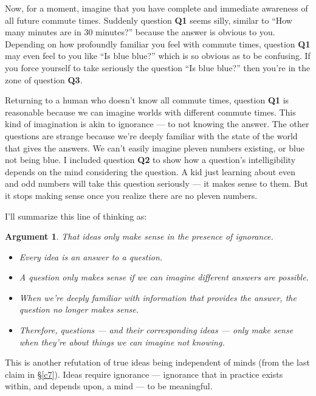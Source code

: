 \documentclass[9pt, twoside]{book}
\theoremstyle{argtstyle}
\newtheorem*{argt}{Argument}
\begin{document}
Now, for a moment, imagine that you have complete and immediate awareness of all
future commute times. Suddenly question {\bf Q1} seems silly, similar to
``How many minutes are in 30 minutes?''
because the answer is obvious to you.
Depending on how profoundly
familiar you feel with commute times, question {\bf Q1} may even feel to you
like ``Is blue blue?'' which is so obvious as to be confusing. If you force
yourself to take seriously the question ``Is blue blue?'' then you're in the
zone of question {\bf Q3}.

Returning to a human who doesn't know all commute times,
question {\bf Q1} is
reasonable because we can imagine worlds with different commute
times. This kind of imagination is akin to ignorance --- to not knowing the
answer.
The other questions are strange because we're deeply familiar with the state of
the world that gives the answers. We can't easily imagine pleven numbers
existing, or blue not being blue.
I included question {\bf Q2} to show how a question's intelligibility
depends on the mind
considering the question. A kid just learning about even and odd numbers will
take this question seriously --- it makes sense to them. But it stops making
sense once you realize there are no pleven numbers.

I'll summarize this line of thinking as:
\begin{argt} That ideas only make sense in the presence of ignorance.
    \label{a3}
    \normalfont
    \begin{itemize}
        \item Every idea is an answer to a question.
        \item A question only makes sense if we can imagine different
            answers are possible.
        \item When we're deeply familiar with information that
            provides the answer, the question no longer makes sense.
        \item Therefore, questions --- and their corresponding ideas --- only
            make sense when they're about things we can imagine not knowing.
    \end{itemize}
\end{argt}
This is another refutation of true ideas being independent of minds (from
the last claim in \S\ref{c7}).
Ideas require ignorance --- ignorance that in practice
exists within, and depends upon, a mind ---
to be meaningful.

\end{document}
